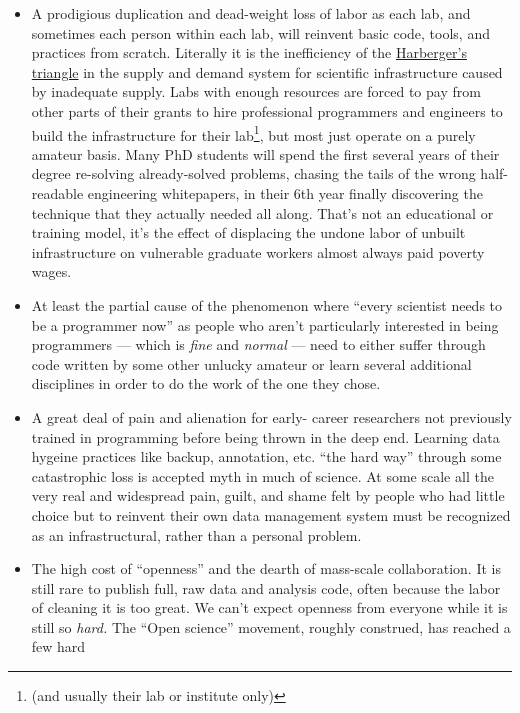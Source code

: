 \begin{itemize}
\tightlist
\item
  A prodigious duplication and dead-weight loss of labor as each lab,
  and sometimes each person within each lab, will reinvent basic code,
  tools, and practices from scratch. Literally it is the inefficiency of
  the
  \href{https://en.wikipedia.org/wiki/Deadweight_loss\#Harberger's_triangle}{Harberger's
  triangle} in the supply and demand system for scientific
  infrastructure caused by inadequate supply. Labs with enough resources
  are forced to pay from other parts of their grants to hire
  professional programmers and engineers to build the infrastructure for
  their lab\footnote{(and usually their lab or institute only)}, but
  most just operate on a purely amateur basis. Many PhD students will
  spend the first several years of their degree re-solving
  already-solved problems, chasing the tails of the wrong half-readable
  engineering whitepapers, in their 6th year finally discovering the
  technique that they actually needed all along. That's not an
  educational or training model, it's the effect of displacing the
  undone labor of unbuilt infrastructure on vulnerable graduate workers
  almost always paid poverty wages.
\item
  At least the partial cause of the phenomenon where ``every scientist
  needs to be a programmer now'' as people who aren't particularly
  interested in being programmers --- which is \emph{fine} and
  \emph{normal} --- need to either suffer through code written by some
  other unlucky amateur or learn several additional disciplines in order
  to do the work of the one they chose.
\item
  A great deal of pain and alienation for early- career researchers not
  previously trained in programming before being thrown in the deep end.
  Learning data hygeine practices like backup, annotation, etc. ``the
  hard way'' through some catastrophic loss is accepted myth in much of
  science. At some scale all the very real and widespread pain, guilt,
  and shame felt by people who had little choice but to reinvent their
  own data management system must be recognized as an infrastructural,
  rather than a personal problem.
\item
  The high cost of ``openness'' and the dearth of mass-scale
  collaboration. It is still rare to publish full, raw data and analysis
  code, often because the labor of cleaning it is too great. We can't
  expect openness from everyone while it is still so \emph{hard.} The
  ``Open science'' movement, roughly construed, has reached a few hard

\end{itemize}
